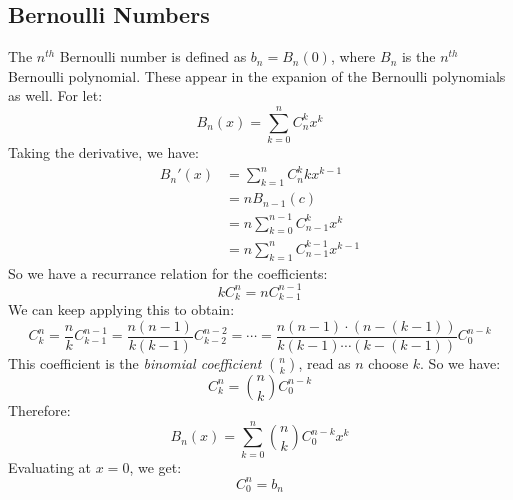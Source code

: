 \documentclass[crop=false,class=book,oneside]{standalone}
\begin{document}
        \subsection{Bernoulli Numbers}
            The $n^{th}$ Bernoulli number is defined
            as $b_{n}=B_{n}(0)$, where $B_{n}$ is the
            $n^{th}$ Bernoulli polynomial. These appear in
            the expanion of the Bernoulli polynomials as well.
            For let:
            \begin{equation}
                B_{n}(x)=\sum_{k=0}^{n}C_{n}^{k}x^{k}
            \end{equation}
            Taking the derivative, we have:
            \begin{subequations}
                \begin{align}
                    B_{n}'(x)
                    &=\sum_{k=1}^{n}C_{n}^{k}kx^{k-1}\\
                    &=nB_{n-1}(c)\\
                    &=n\sum_{k=0}^{n-1}C_{n-1}^{k}x^{k}\\
                    &=n\sum_{k=1}^{n}C_{n-1}^{k-1}x^{k-1}
                \end{align}
            \end{subequations}
            So we have a recurrance relation for the coefficients:
            \begin{equation}
                kC_{k}^{n}=nC_{k-1}^{n-1}
            \end{equation}
            We can keep applying this to obtain:
            \begin{equation}
                C_{k}^{n}=\frac{n}{k}C_{k-1}^{n-1}
                =\frac{n(n-1)}{k(k-1)}C_{k-2}^{n-2}=\cdots
                =\frac{n(n-1)\cdot(n-(k-1))}{k(k-1)\cdots(k-(k-1))}
                C_{0}^{n-k}
            \end{equation}
            This coefficient is the \textit{binomial coefficient}
            $\binom{n}{k}$, read as $n$ choose $k$. So we have:
            \begin{equation}
                C_{k}^{n}=\binom{n}{k}C_{0}^{n-k}
            \end{equation}
            Therefore:
            \begin{equation}
                B_{n}(x)=\sum_{k=0}^{n}
                \binom{n}{k}C_{0}^{n-k}x^{k}
            \end{equation}
            Evaluating at $x=0$, we get:
            \begin{equation}
                C_{0}^{n}=b_{n}
            \end{equation}
\end{document}
